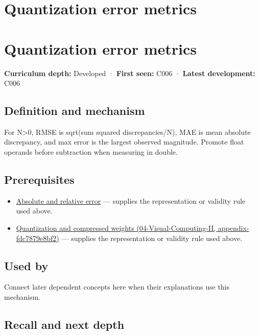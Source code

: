 \hypertarget{appendix-537171d69d27}{}
\section*{Quantization error metrics}
\section{Quantization error metrics}\label{appendix-537171d69d27-quantization-error-metrics}

\textbf{Curriculum depth:} Developed · \textbf{First seen:} C006 · \textbf{Latest development:} C006

\subsection{Definition and mechanism}\label{appendix-537171d69d27-definition-and-mechanism}

For N\textgreater0, RMSE is sqrt(sum squared discrepancies/N), MAE is mean absolute discrepancy, and max error is the largest observed magnitude. Promote float operands before subtraction when measuring in double.

\subsection{Prerequisites}\label{appendix-537171d69d27-prerequisites}

\begin{itemize}
\tightlist
\item
  \hyperref[appendix-3ae74e89b4e6]{Absolute and relative error} --- supplies the representation or validity rule used above.
\item
  \href{../04-Visual-Computing-II/main.pdf\#nameddest=appendix-fdc7879e8bf2}{Quantization and compressed weights (04-Visual-Computing-II, appendix-fdc7879e8bf2)} --- supplies the representation or validity rule used above.
\end{itemize}

\subsection{Used by}\label{appendix-537171d69d27-used-by}

Connect later dependent concepts here when their explanations use this mechanism.

\subsection{Recall and next depth}\label{appendix-537171d69d27-recall-and-next-depth}

